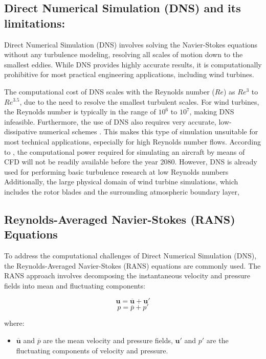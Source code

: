 \subsection{Direct Numerical Simulation (DNS) and its limitations:}
Direct Numerical Simulation (DNS) involves solving the Navier-Stokes equations without any turbulence modeling, 
resolving all scales of motion down to the smallest eddies. While DNS provides highly accurate results, 
it is computationally prohibitive for most practical engineering applications, including wind turbines.

The computational cost of DNS scales with the Reynolds number ($Re$) as $Re^{3}$ to $Re^{3.5}$, 
due to the need to resolve the smallest turbulent scales. For wind turbines, the Reynolds number is typically in the range of $10^6$ to $10^7$, 
making DNS infeasible. Furthermore, the use of DNS also requires very accurate, low-dissipative numerical schemes
\cite{mocket2009}. This makes this type of simulation unsuitable for most technical applications,
especially for high Reynolds number flows. According to \cite{spalart2000}, the computational
power required for simulating an aircraft by means of CFD will not be readily available before
the year 2080. However, DNS is already used for performing basic turbulence research at low
Reynolds numbers 
Additionally, the large physical domain of wind turbine simulations, which includes the rotor blades and the surrounding atmospheric boundary layer, 
\subsection{Reynolds-Averaged Navier-Stokes (RANS) Equations}
To address the computational challenges of Direct Numerical Simulation (DNS), the Reynolds-Averaged Navier-Stokes (RANS) equations are commonly used. The RANS approach involves decomposing the instantaneous velocity and pressure fields into mean and fluctuating components:

\begin{equation}
\mathbf{u} = \overline{\mathbf{u}} + \mathbf{u}'
\end{equation}
\begin{equation}
p = \overline{p} + p'
\end{equation}

where:
\begin{itemize}
    \item $\overline{\mathbf{u}}$ and $\overline{p}$ are the mean velocity and pressure fields, $\mathbf{u}'$ and $p'$ are the fluctuating components of velocity and pressure.
\end{itemize}

